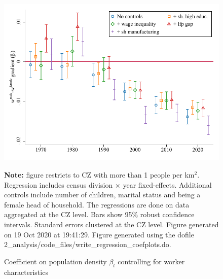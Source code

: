 \begin{figure}[!h]
\centering
\caption{Coefficient on population density $ \beta_t $ controlling for worker characteristics}
\includegraphics[width=.6\textwidth]{../2_analysis/output/figures/with_control_gradients_czone_l_czone_density_full_time}
\par \begin{minipage}[h]{\textwidth}{\tiny\textbf{Note:} figure restricts to CZ with more than 1 people per km$^2$. Regression includes census division $\times $ year fixed-effects. Additional controls include number of children, marital status and being a female head of household. The regressions are done on data aggregated at the CZ level. Bars show 95\% robust confidence intervals. Standard errors clustered at the CZ level. Figure generated on 19 Oct 2020 at 19:41:29. Figure generated using the dofile 2\_analysis/code\_files/write\_regression\_coefplots.do.}\end{minipage}
\end{figure}
